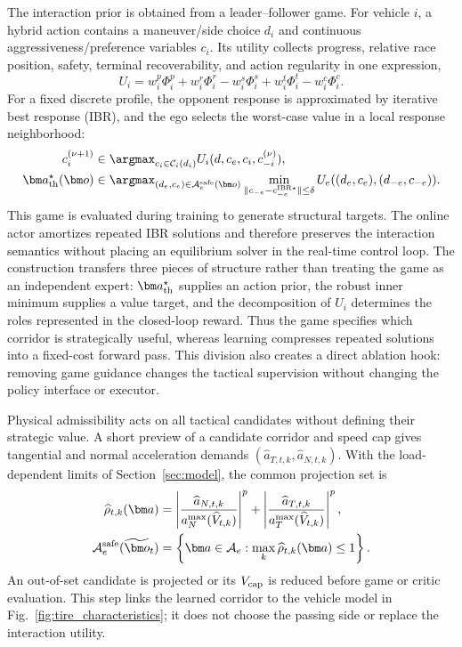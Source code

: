 The interaction prior is obtained from a leader--follower game.  For vehicle
$i$, a hybrid action contains a maneuver/side choice $d_i$ and continuous
aggressiveness/preference variables $c_i$.  Its utility collects progress,
relative race position, safety, terminal recoverability, and action
regularity in one expression,
\begin{equation}
U_i=w_i^p\Phi_i^p+w_i^r\Phi_i^r-w_i^s\Phi_i^s
    +w_i^t\Phi_i^t-w_i^c\Phi_i^c .
\label{eq:utility_decomposition}
\end{equation}
For a fixed discrete profile, the opponent response is approximated by
iterative best response (IBR), and the ego selects the worst-case value in a
local response neighborhood:
\begin{equation}
\begin{aligned}
c_i^{(\nu+1)}&\in\argmax_{c_i\in\mathcal C_i(d_i)}
 U_i(d,c_e,c_i,c_{-i}^{(\nu)}),\\
\bm a_{\rm th}^{\star}(\bm o)&\in
\argmax_{(d_e,c_e)\in\mathcal A_e^{\rm safe}(\bm o)}
\min_{\|c_{-e}-c_{-e}^{\rm IBR\star}\|\le\delta}
U_e((d_e,c_e),(d_{-e},c_{-e})).
\end{aligned}
\label{eq:ibr_decision}
\end{equation}
This game is evaluated during training to generate structural targets.  The
online actor amortizes repeated IBR solutions and therefore preserves the
interaction semantics without placing an equilibrium solver in the real-time
control loop.
The construction transfers three pieces of structure rather than treating the
game as an independent expert: $\bm a_{\rm th}^{\star}$ supplies an action
prior, the robust inner minimum supplies a value target, and the decomposition
of $U_i$ determines the roles represented in the closed-loop reward.  Thus the
game specifies which corridor is strategically useful, whereas learning
compresses repeated solutions into a fixed-cost forward pass.  This division
also creates a direct ablation hook: removing game guidance changes the
tactical supervision without changing the policy interface or executor.

Physical admissibility acts on all tactical candidates without defining their
strategic value. A short preview of a candidate corridor and speed cap gives
tangential and normal acceleration demands
$(\widehat a_{T,t,k},\widehat a_{N,t,k})$. With the load-dependent limits of
Section~\ref{sec:model}, the common projection set is
\begin{equation}
\begin{aligned}
\widehat\rho_{t,k}(\bm a)&=
\left|\frac{\widehat a_{N,t,k}}{a_N^{\max}(\widehat V_{t,k})}\right|^p+
\left|\frac{\widehat a_{T,t,k}}{a_T^{\max}(\widehat V_{t,k})}\right|^p,\\
\mathcal A_e^{\rm safe}(\widetilde{\bm o}_t)&=
\left\{\bm a\in\mathcal A_e:\max_k\widehat\rho_{t,k}(\bm a)\le1\right\}.
\end{aligned}
\label{eq:tire_safe_action}
\end{equation}
An out-of-set candidate is projected or its $V_{\rm cap}$ is reduced before
game or critic evaluation. This step links the learned corridor to the vehicle
model in Fig.~\ref{fig:tire_characteristics}; it does not choose the passing
side or replace the interaction utility.

